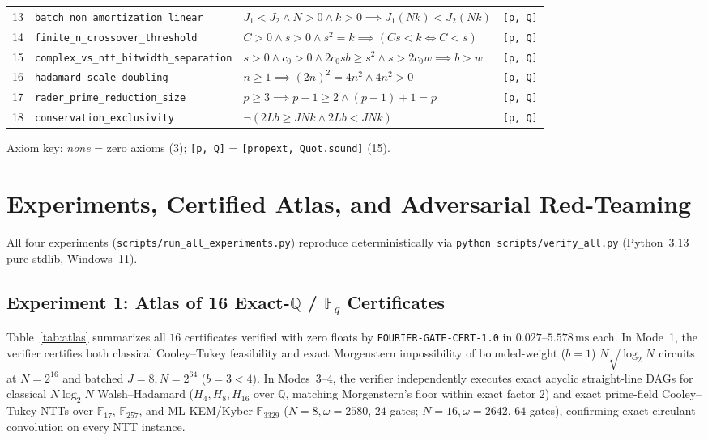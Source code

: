 \documentclass[11pt,a4paper]{article}
\theoremstyle{definition}
\theoremstyle{remark}
\newcommand{\QQ}{\mathbb{Q}}
\newcommand{\FF}{\mathbb{F}}
\newcommand{\certschema}{\texttt{FOURIER-GATE-CERT-1.0}}
\begin{document}
\begin{table}[t]
{\begin{tabular}{@{}rlll@{}}
13 & \texttt{batch\_non\_amortization\_linear} & $J_1 < J_2 \wedge N > 0 \wedge k > 0 \implies J_1 (N k) < J_2 (N k)$ & \texttt{[p, Q]} \\
14 & \texttt{finite\_n\_crossover\_threshold} & $C > 0 \wedge s > 0 \wedge s^2 = k \implies (C s < k \iff C < s)$ & \texttt{[p, Q]} \\
15 & \texttt{complex\_vs\_ntt\_bitwidth\_separation} & $s > 0 \wedge c_0 > 0 \wedge 2 c_0 s b \ge s^2 \wedge s > 2 c_0 w \implies b > w$ & \texttt{[p, Q]} \\
16 & \texttt{hadamard\_scale\_doubling} & $n \ge 1 \implies (2n)^2 = 4n^2 \wedge 4n^2 > 0$ & \texttt{[p, Q]} \\
17 & \texttt{rader\_prime\_reduction\_size} & $p \ge 3 \implies p - 1 \ge 2 \wedge (p - 1) + 1 = p$ & \texttt{[p, Q]} \\
18 & \texttt{conservation\_exclusivity} & $\neg(2Lb \ge JNk \wedge 2Lb < JNk)$ & \texttt{[p, Q]} \\
\bottomrule
\end{tabular}}
\vspace{-0.3em}
\begin{flushleft}
\tiny Axiom key: \emph{none} = zero axioms (3); \texttt{[p, Q]} = \texttt{[propext, Quot.sound]} (15).
\end{flushleft}
\end{table}

\section{Experiments, Certified Atlas, and Adversarial Red-Teaming}\label{sec:experiments}

All four experiments (\texttt{scripts/run\_all\_experiments.py}) reproduce deterministically via \texttt{python scripts/verify\_all.py} (Python~3.13 pure-stdlib, Windows~11).

\subsection{Experiment 1: Atlas of 16 Exact-\texorpdfstring{$\QQ$}{Q} / \texorpdfstring{$\FF_q$}{Fq} Certificates}

Table~\ref{tab:atlas} summarizes all $16$ certificates verified with zero floats by \certschema{} in $0.027$--$5.578\,\mathrm{ms}$ each. In Mode~1, the verifier certifies both classical Cooley--Tukey feasibility and exact Morgenstern impossibility of bounded-weight ($b=1$) $N\sqrt{\log_2 N}$ circuits at $N=2^{16}$ and batched $J=8, N=2^{64}$ ($b=3 < 4$). In Modes~3--4, the verifier independently executes exact acyclic straight-line DAGs for classical $N\log_2 N$ Walsh--Hadamard ($H_4, H_8, H_{16}$ over $\QQ$, matching Morgenstern's floor within exact factor $2$) and exact prime-field Cooley--Tukey NTTs over $\FF_{17}$, $\FF_{257}$, and ML-KEM/Kyber $\FF_{3329}$ ($N=8, \omega=2580$, $24$ gates; $N=16, \omega=2642$, $64$ gates), confirming exact circulant convolution on every NTT instance.
\end{document}
